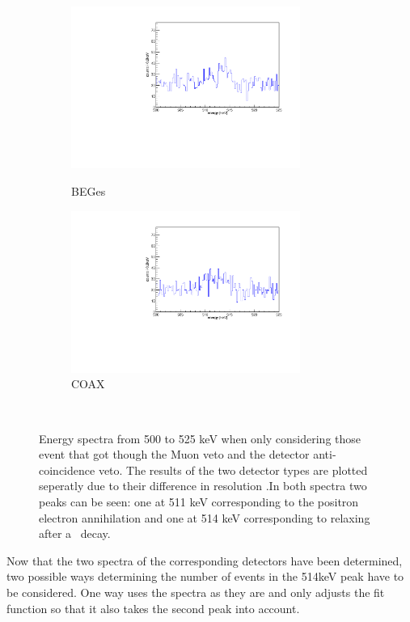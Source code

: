 \documentclass[encoding=utf8,british]{tumphthesis}
\begin{document}
\begin{figure}[t!]
\centering
\begin{subfigure}{.5\textwidth}
  \centering
	\includegraphics[width=75mm]{./Bilder/500525NoFilterBEGes.pdf}
  \label{fig:NoFilterBEGes}
  \caption{BEGes}
\end{subfigure}\hfill%
\begin{subfigure}{.5\textwidth}
  \centering
	\includegraphics[width=75mm]{./Bilder/500525NoFilterCOAX.pdf}
  \caption{COAX}
  \label{fig:NoFilterCOAX}
\end{subfigure}
    \\
	\vspace{0.5cm}
	\caption{Energy spectra from 500 to 525 keV when only considering those event that got though the Muon veto and the detector anti-coincidence veto. The results of the two detector types are plotted seperatly due to their difference in resolution .In both spectra two peaks can be seen: one at 511 keV corresponding to the positron electron annihilation and one at 514 keV corresponding to  relaxing after a \Kr\ decay.}
\end{figure}

Now that the two spectra of the corresponding detectors have been determined, two possible ways determining the number of events in the 514keV peak have to be considered.
One way uses the spectra as they are and only adjusts the fit function so that it also takes the second peak into account.
\end{document}
